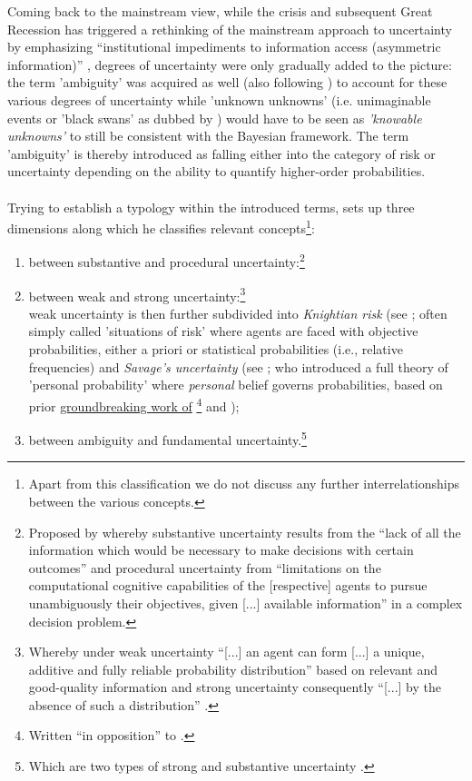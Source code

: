 \documentclass[a4paper,11pt,listof=nochaptergap,oneside,pointednumbers,bibtotoc,bigheadings,liststotoc]{scrbook}
\theoremstyle{mysatz}
\theoremstyle{mydefinition}
\theoremstyle{mytheorem}
\theoremstyle{mybemerkung}
\begin{document}
Coming back to the mainstream view, while the crisis and subsequent Great Recession has triggered a rethinking of the mainstream approach to uncertainty by emphasizing ``institutional impediments to information access (asymmetric information)'' \citep[p. 8]{dow:16}, degrees of uncertainty were only gradually added to the picture: the term 'ambiguity' was acquired as well (also following \citealp[p. 330]{camererandweber:92}) to account for these various degrees of uncertainty while 'unknown unknowns' (i.e. unimaginable events or 'black swans' as dubbed by \citealp{taleb:08}) would have to be seen as \textit{'knowable unknowns'} to still be consistent with the Bayesian framework. The term 'ambiguity' is thereby introduced as falling either into the category of risk or uncertainty depending on the ability to quantify higher-order probabilities.\\
\\
Trying to establish a typology within the introduced terms, \citet{dequech:14}  sets up three dimensions along which he classifies relevant concepts\footnote{Apart from this classification we do not discuss any further interrelationships between the various concepts.}: 
\begin{enumerate}
	\item between substantive and procedural uncertainty:\footnote{Proposed by \citet[p. 145]{dosiandegidi:91} whereby substantive uncertainty results from the ``lack of all the information which would be necessary to make decisions with certain outcomes'' and procedural uncertainty from ``limitations on the computational cognitive capabilities of the [respective] agents to pursue unambiguously their objectives, given [...] available information'' in a complex decision problem. }
	\item between weak and strong uncertainty:\footnote{Whereby under weak uncertainty ``[...] an agent can form [...] a unique, additive and fully reliable probability distribution'' based on relevant and good-quality information and strong uncertainty consequently ``[...] by the absence of such a distribution'' \citep[p. 622/623]{dequech:14}.} \\
	weak uncertainty is then further subdivided into \textit{Knightian risk} (see \citet{knight:21}; often simply called 'situations of risk' where agents are faced with objective probabilities, either a priori or statistical probabilities (i.e., relative frequencies) and \textit{Savage's uncertainty} (see \citet{savage:54}; who introduced a full theory of 'personal probability' where \textit{personal} belief governs probabilities, based on prior \href{https://archive.org/stream/in.ernet.dli.2015.223806/2015.223806.The-Foundations#page/n289/mode/2up}{groundbreaking work of} \href{http://www.brunodefinetti.it/Link/Subjective%20Expected%20Utility%20-%20Intro.htm}{\citet{ramsey:26}\footnote{Written ``in opposition'' to \citet{keynes:21}.} and \citet{finetti:37}});
	\item between ambiguity and fundamental uncertainty.\footnote{Which are two types of strong and substantive uncertainty \citep{dequesh:00}.}
\end{enumerate}
\vspace{1cm}
\end{document}
